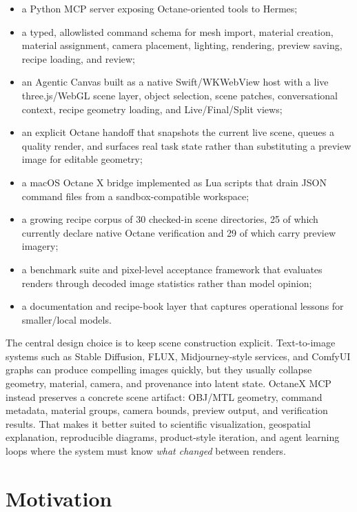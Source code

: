 \documentclass[11pt,a4paper]{article}
\newcommand{\project}{OctaneX MCP}
\begin{document}
\begin{itemize}[leftmargin=*]
  \item a Python MCP server exposing Octane-oriented tools to Hermes;
  \item a typed, allowlisted command schema for mesh import, material creation, material assignment, camera placement, lighting, rendering, preview saving, recipe loading, and review;
  \item an Agentic Canvas built as a native Swift/WKWebView host with a live three.js/WebGL scene layer, object selection, scene patches, conversational context, recipe geometry loading, and Live/Final/Split views;
  \item an explicit Octane handoff that snapshots the current live scene, queues a quality render, and surfaces real task state rather than substituting a preview image for editable geometry;
  \item a macOS Octane X bridge implemented as Lua scripts that drain JSON command files from a sandbox-compatible workspace;
  \item a growing recipe corpus of 30 checked-in scene directories, 25 of which currently declare native Octane verification and 29 of which carry preview imagery;
  \item a benchmark suite and pixel-level acceptance framework that evaluates renders through decoded image statistics rather than model opinion;
  \item a documentation and recipe-book layer that captures operational lessons for smaller/local models.
\end{itemize}

The central design choice is to keep scene construction explicit. Text-to-image systems such as Stable Diffusion, FLUX, Midjourney-style services, and ComfyUI graphs can produce compelling images quickly, but they usually collapse geometry, material, camera, and provenance into latent state. \project{} instead preserves a concrete scene artifact: OBJ/MTL geometry, command metadata, material groups, camera bounds, preview output, and verification results. That makes it better suited to scientific visualization, geospatial explanation, reproducible diagrams, product-style iteration, and agent learning loops where the system must know \emph{what changed} between renders.

\section{Motivation}
\end{document}
